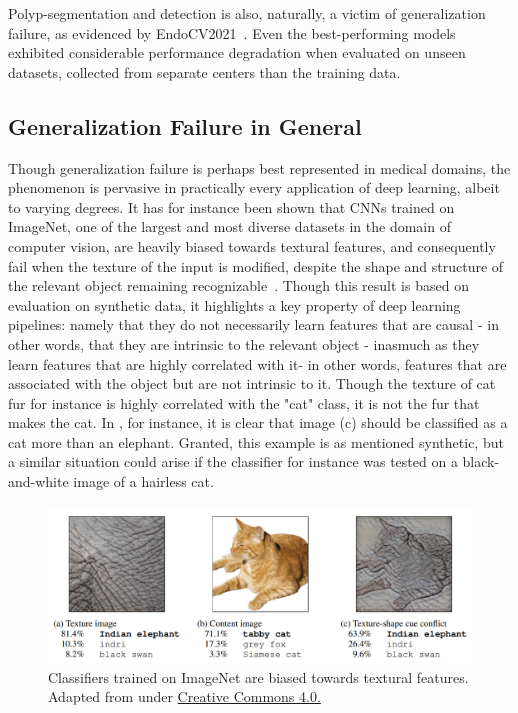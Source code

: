 	Polyp-segmentation and detection is also, naturally, a victim of generalization failure, as evidenced by EndoCV2021~\cite{endocv2021}. Even the best-performing models exhibited considerable performance degradation when evaluated on unseen datasets, collected from separate centers than the training data. 
	 
	\subsection{Generalization Failure in General}
	Though generalization failure is perhaps best represented in medical domains, the phenomenon is pervasive in practically every application of deep learning, albeit to varying degrees. It has for instance been shown that CNNs trained on ImageNet, one of the largest and most diverse datasets in the domain of computer vision, are heavily biased towards textural features, and consequently fail when the texture of the input is modified, despite the shape and structure of the relevant object remaining recognizable~\cite{texturebias}. Though this result is based on evaluation on synthetic data, it highlights a key property of deep learning pipelines: namely that they do not necessarily learn features that are causal - in other words, that they are intrinsic to the relevant object - inasmuch as they learn features that are highly correlated with it- in other words, features that are associated with the object but are not intrinsic to it. Though the texture of cat fur for instance is highly correlated with the "cat" class, it is not the fur that makes the cat. In , for instance, it is clear that image (c) should be classified as a cat more than an elephant. Granted, this example is as mentioned synthetic, but a similar situation could arise if the classifier for instance was tested on a black-and-white image of a hairless cat. 
	\begin{figure}[htb]
		\includegraphics[width=\linewidth]{illustrations/cat_elephant.png}
		\caption{Classifiers trained on ImageNet are biased towards textural features. Adapted from \cite{texturebias} under \href{https://github.com/rgeirhos/texture-vs-shape/blob/master/DATASET_LICENSE}{Creative Commons 4.0.}}
		\label{cat_elephant}
	\end{figure}
	
